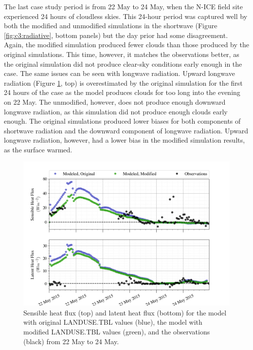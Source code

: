 The last case study period is from 22 May to 24 May, when the N-ICE field site experienced 24 hours of cloudless skies. This 24-hour period was captured well by both the modified and unmodified simulations in the shortwave (Figure \ref{fig:c3:radiative}, bottom panels) but the day prior had some disagreement. Again, the modified simulation produced fewer clouds than those produced by the original simulations. This time, however, it matches the observations better, as the original simulation did not produce clear-sky conditions early enough in the case. The same issues can be seen with longwave radiation. Upward longwave radiation (Figure \ref{fig:c3:heat}, top) is overestimated by the original simulation for the first 24 hours of the case as the model produces clouds for too long into the evening on 22 May. The unmodified, however, does not produce enough downward longwave radiation, as this simulation did not produce enough clouds early enough. The original simulations produced lower biases for both components of shortwave radiation and the downward component of longwave radiation. Upward longwave radiation, however, had a lower bias in the modified simulation results, as the surface warmed. 

\begin{figure}[h]
    \centering
    \includegraphics[width=1\linewidth]{figures/chapter6/case3_sensible_latent.png}
    \caption[Idealized Case 3 - Latent and sensible heat fluxes.]{Sensible heat flux (top) and latent heat flux (bottom) for the model with original LANDUSE.TBL values (blue), the model with modified LANDUSE.TBL values (green), and the observations (black) from 22 May to 24 May.}
    \label{fig:c3:heat}
\end{figure}

